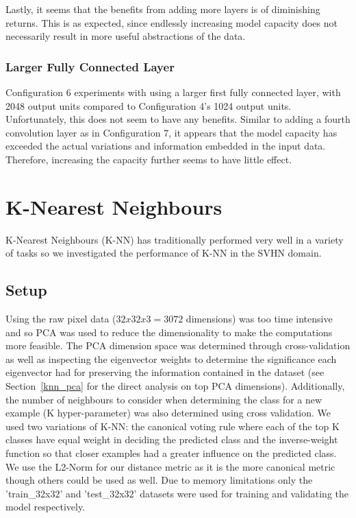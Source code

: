 \documentclass{article} %
\begin{document}
Lastly, it seems that the benefits from adding more layers is of diminishing returns. This is as expected, since endlessly increasing model capacity does not necessarily result in more useful abstractions of the data. 

\subsubsection{Larger Fully Connected Layer}

Configuration 6 experiments with using a larger first fully connected layer, with 2048 output units compared to Configuration 4's 1024 output units. Unfortunately, this does not seem to have any benefits. Similar to adding a fourth convolution layer as in Configuration 7, it appears that the model capacity has exceeded the actual variations and information embedded in the input data. Therefore, increasing the capacity further seems to have little effect.

\section{K-Nearest Neighbours}
K-Nearest Neighbours (K-NN) has traditionally performed very well in a variety of tasks so we investigated the performance of K-NN in the SVHN domain.

\subsection{Setup}
Using the raw pixel data ($32 x 32 x 3 = 3072$ dimensions) was too time intensive and so PCA was used to reduce the dimensionality to make the computations more feasible.  The PCA dimension space was determined through cross-validation as well as inspecting the eigenvector weights to determine the significance each eigenvector had for preserving the information contained in the dataset (see Section~\ref{knn_pca} for the direct analysis on top PCA dimensions).  Additionally, the number of neighbours to consider when determining the class for a new example (K hyper-parameter) was also determined using cross validation.  We used two variations of K-NN: the canonical voting rule where each of the top K classes have equal weight in deciding the predicted class and the inverse-weight function so that closer examples had a greater influence on the predicted class. We use the L2-Norm for our distance metric as it is the more canonical metric though others could be used as well. Due to memory limitations only the 'train\_32x32' and 'test\_32x32' datasets were used for training and validating the model respectively.
\end{document}
